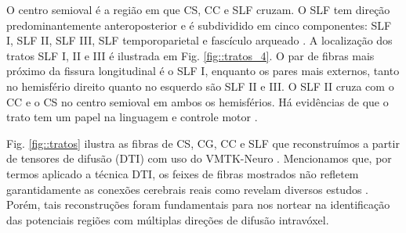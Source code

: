 O centro semioval é a região em que CS, CC e SLF cruzam. O SLF  tem direção predominantemente anteroposterior e é subdividido em cinco componentes: SLF I, SLF II, SLF III, SLF temporoparietal e fascículo arqueado \cite{kamali2014}. A localização dos tratos SLF I, II e III é ilustrada em Fig. \ref{fig::tratos_4}. O par de fibras mais próximo da fissura longitudinal é o SLF I, enquanto os pares mais externos, tanto no hemisfério direito quanto no esquerdo são SLF II e III. O SLF II cruza com o CC e o CS no centro semioval em ambos os hemisférios. Há evidências de que o trato tem um papel na linguagem e controle motor \cite{fortin2012}.%

Fig. \ref{fig::tratos} ilustra as fibras de CS, CG, CC e SLF que reconstruímos a partir de tensores de difusão (DTI) com uso do VMTK-Neuro \cite{VMTKNeuro}. Mencionamos que, por termos aplicado a técnica DTI, os feixes de fibras mostrados não refletem garantidamente as conexões cerebrais reais como revelam diversos estudos \cite{berman2009, tournier2011, bucci2013, descoteaux2015, SCHILLING2019194}. Porém, tais reconstruções foram fundamentais para nos nortear na identificação das potenciais regiões com múltiplas direções de difusão intravóxel.



